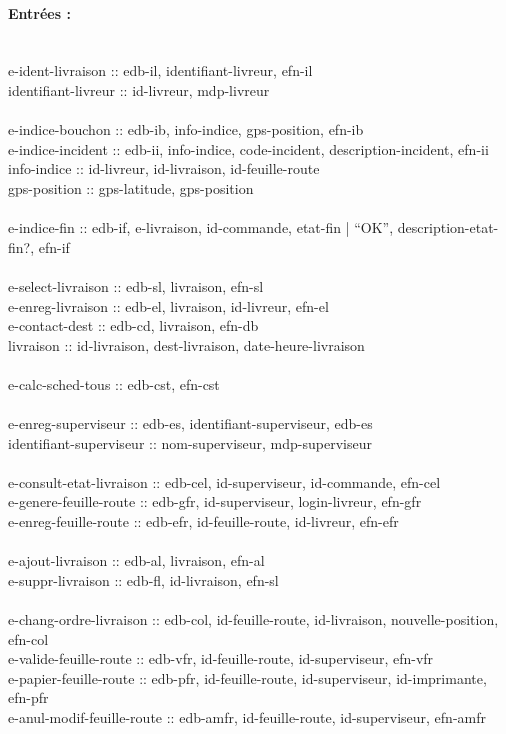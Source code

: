 \documentclass{report}
\begin{document}
\paragraph{Entrées :}
~~\\
e-ident-livraison :: edb-il, identifiant-livreur, efn-il\\
identifiant-livreur :: id-livreur, mdp-livreur\\
~~\\
e-indice-bouchon :: edb-ib, info-indice, gps-position, efn-ib\\
e-indice-incident :: edb-ii, info-indice, code-incident, description-incident, efn-ii\\
info-indice :: id-livreur, id-livraison, id-feuille-route\\
gps-position :: gps-latitude, gps-position\\
~~\\
e-indice-fin :: edb-if, e-livraison, id-commande, etat-fin | “OK”, description-etat-fin?, efn-if\\
~~\\
e-select-livraison :: edb-sl, livraison, efn-sl\\
e-enreg-livraison :: edb-el, livraison, id-livreur, efn-el\\
e-contact-dest :: edb-cd, livraison, efn-db\\
livraison :: id-livraison, dest-livraison, date-heure-livraison\\
~~\\
e-calc-sched-tous :: edb-cst, efn-cst\\
~~\\
e-enreg-superviseur :: edb-es, identifiant-superviseur, edb-es\\
identifiant-superviseur :: nom-superviseur, mdp-superviseur\\
~~\\
e-consult-etat-livraison :: edb-cel, id-superviseur, id-commande, efn-cel\\
e-genere-feuille-route :: edb-gfr, id-superviseur, login-livreur, efn-gfr\\
e-enreg-feuille-route :: edb-efr, id-feuille-route, id-livreur, efn-efr\\
~~\\
e-ajout-livraison :: edb-al, livraison, efn-al\\
e-suppr-livraison :: edb-fl, id-livraison, efn-sl\\
~~\\
e-chang-ordre-livraison :: edb-col, id-feuille-route, id-livraison, nouvelle-position, efn-col\\
e-valide-feuille-route :: edb-vfr, id-feuille-route, id-superviseur, efn-vfr\\
e-papier-feuille-route :: edb-pfr, id-feuille-route, id-superviseur, id-imprimante, efn-pfr\\
e-anul-modif-feuille-route :: edb-amfr, id-feuille-route, id-superviseur, efn-amfr\\
\end{document}
